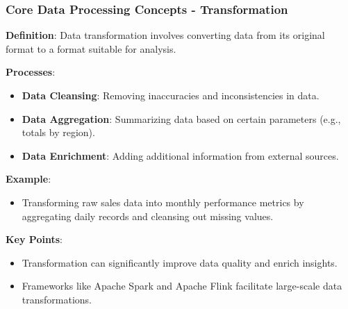 \documentclass[aspectratio=169]{beamer}
\begin{document}
\begin{frame}[fragile]
    \frametitle{Core Data Processing Concepts - Transformation}
    \textbf{Definition}: Data transformation involves converting data from its original format to a format suitable for analysis.
    
    \textbf{Processes}:
    \begin{itemize}
        \item \textbf{Data Cleansing}: Removing inaccuracies and inconsistencies in data.
        \item \textbf{Data Aggregation}: Summarizing data based on certain parameters (e.g., totals by region).
        \item \textbf{Data Enrichment}: Adding additional information from external sources.
    \end{itemize}

    \textbf{Example}:
    \begin{itemize}
        \item Transforming raw sales data into monthly performance metrics by aggregating daily records and cleansing out missing values.
    \end{itemize}

    \textbf{Key Points}:
    \begin{itemize}
        \item Transformation can significantly improve data quality and enrich insights.
        \item Frameworks like Apache Spark and Apache Flink facilitate large-scale data transformations.
    \end{itemize}
\end{frame}
\end{document}
